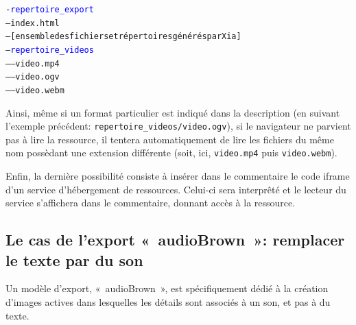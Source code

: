 {%
\begin{tikzpicture}
\end{tikzpicture}
\parbox{0.40\textwidth}
{
\begin{alltt}
 -\textcolor{blue}{repertoire\_export}\\
 ---index.html\\
 ---[ensemble des fichiers et répertoires générés par Xia]\\
 ---\textcolor{blue}{repertoire\_videos}\\
 -----video.mp4\\
 -----video.ogv\\
 -----video.webm\\
\end{alltt}
}


Ainsi, même si un format particulier est indiqué dans la description (en suivant l'exemple précédent: \verb|repertoire_videos/video.ogv|),
si le navigateur ne parvient pas à lire la ressource, il tentera automatiquement de lire les fichiers du même nom 
possèdant une extension différente (soit, ici, \verb|video.mp4| puis \verb|video.webm|).

Enfin, la dernière possibilité consiste à insérer dans le commentaire le code iframe d'un service d'hébergement de ressources.
Celui-ci sera interprêté et le lecteur du service s'affichera dans le commentaire, donnant accès à la ressource.

\subsection{Le cas de l'export «~audioBrown~»: remplacer le texte par du son}

Un modèle d'export, «~audioBrown~», est spécifiquement dédié à la création d'images actives 
dans lesquelles les détails sont associés à un son, et pas à du texte.

}
